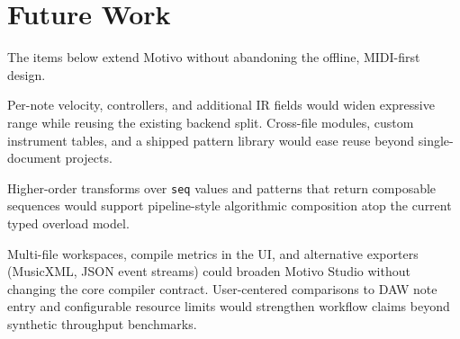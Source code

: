 \section{Future Work}\label{sec:future-work}

The items below extend Motivo without abandoning the offline, MIDI-first design.

Per-note velocity, controllers, and additional IR fields would widen expressive range while reusing the existing
backend split.
Cross-file modules, custom instrument tables, and a shipped pattern library would ease reuse beyond single-document
projects.

Higher-order transforms over \texttt{seq} values and patterns that return composable sequences
would support pipeline-style algorithmic composition atop the current typed overload model.

Multi-file workspaces, compile metrics in the UI, and alternative exporters (MusicXML, JSON event streams) could broaden
Motivo Studio without changing the core compiler contract.
User-centered comparisons to DAW note entry and configurable resource limits would strengthen workflow claims beyond
synthetic throughput benchmarks.
